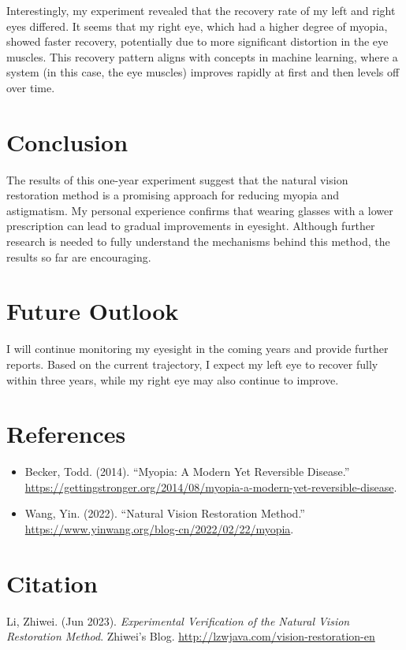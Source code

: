 \documentclass[12pt]{article}
\begin{document}
Interestingly, my experiment revealed that the recovery rate of my left and right eyes differed. It seems that my right eye, which had a higher degree of myopia, showed faster recovery, potentially due to more significant distortion in the eye muscles. This recovery pattern aligns with concepts in machine learning, where a system (in this case, the eye muscles) improves rapidly at first and then levels off over time.

\section{Conclusion}
The results of this one-year experiment suggest that the natural vision restoration method is a promising approach for reducing myopia and astigmatism. My personal experience confirms that wearing glasses with a lower prescription can lead to gradual improvements in eyesight. Although further research is needed to fully understand the mechanisms behind this method, the results so far are encouraging.

\section{Future Outlook}
I will continue monitoring my eyesight in the coming years and provide further reports. Based on the current trajectory, I expect my left eye to recover fully within three years, while my right eye may also continue to improve.

\section{References}
\begin{itemize}
    \item Becker, Todd. (2014). ``Myopia: A Modern Yet Reversible Disease.'' \url{https://gettingstronger.org/2014/08/myopia-a-modern-yet-reversible-disease}.
    \item Wang, Yin. (2022). ``Natural Vision Restoration Method.'' \url{https://www.yinwang.org/blog-cn/2022/02/22/myopia}.
\end{itemize}

\section{Citation}
Li, Zhiwei. (Jun 2023). \textit{Experimental Verification of the Natural Vision Restoration Method}. Zhiwei's Blog. \url{http://lzwjava.com/vision-restoration-en}
\end{document}
